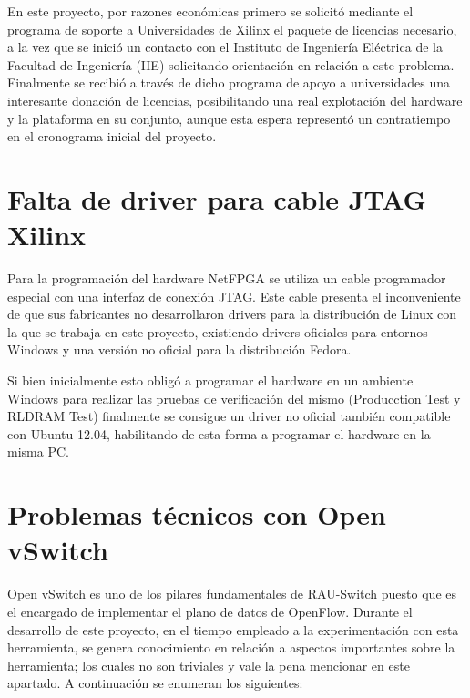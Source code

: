 En este proyecto, por razones econ\'omicas primero se solicit\'o mediante el programa de soporte a Universidades de Xilinx el paquete de licencias necesario, a la vez que se inici\'o un contacto con el Instituto de Ingeniería Eléctrica de la Facultad de Ingeniería (IIE) solicitando orientación en relación a este problema. Finalmente se recibi\'o a través de dicho programa de apoyo a universidades una interesante donación de licencias, posibilitando una real explotación del hardware y la plataforma en su conjunto, aunque esta espera represent\'o un contratiempo en el cronograma inicial del proyecto. 

\section{Falta de driver para cable JTAG Xilinx}
Para la programación del hardware NetFPGA se utiliza un cable programador especial con una interfaz de conexi\'on JTAG.  Este cable presenta el inconveniente de que sus fabricantes no desarrollaron drivers para la distribución de Linux con la que se trabaja en este proyecto, existiendo drivers oficiales para entornos Windows y una versi\'on no oficial para la distribución Fedora.

Si bien inicialmente esto oblig\'o a programar el hardware en un ambiente Windows para realizar las pruebas de verificaci\'on del mismo (Producction Test y RLDRAM Test) finalmente se consigue un driver no oficial\cite{JtagD} tambi\'en compatible con Ubuntu 12.04, habilitando de esta forma a programar el hardware en la misma PC.

\section{Problemas t\'ecnicos con Open vSwitch}
\label{apendiceB5}

Open vSwitch es uno de los pilares fundamentales de RAU-Switch puesto que es el encargado de implementar el plano de datos de OpenFlow. Durante el desarrollo de este proyecto, en el tiempo empleado a la experimentaci\'on con esta herramienta, se genera conocimiento en relaci\'on a aspectos importantes sobre la herramienta; los cuales no son triviales y vale la pena mencionar en este apartado. A continuaci\'on se enumeran los siguientes:

